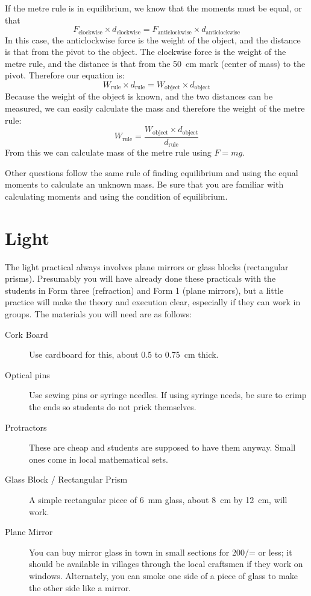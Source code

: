 If the metre rule is in equilibrium, we know that the moments must be equal, or
that $$F_{\mathrm{clockwise}} \times d_{\mathrm{clockwise}} = F_{\mathrm{anticlockwise}} \times d_{\mathrm{anticlockwise}}$$
In this case, the anticlockwise force is the weight of the object, and the distance is that
from the pivot to the object. The clockwise force is the weight of the metre rule, and the
distance is that from the 50~cm mark (center of mass) to the pivot. Therefore our
equation is: $$ W_{\mathrm{rule}} \times d_{\mathrm{rule}} = W_{\mathrm{object}} \times d_{\mathrm{object}} $$
Because the weight of the object is known, and the two distances can be measured, we
can easily calculate the mass and therefore the weight of the metre rule:
$$W_{\mathrm{rule}} = \frac{W_{\mathrm{object}} \times d_{\mathrm{object}}}{d_{\mathrm{rule}}}$$
From this we can calculate mass of the metre rule using $F = mg$.

Other questions follow the same rule of finding equilibrium and using the equal
moments to calculate an unknown mass. Be sure that you are familiar with calculating
moments and using the condition of equilibrium.

\section{Light}
The light practical always involves plane mirrors or glass blocks (rectangular
prisms). Presumably you will have already done these practicals with the students in Form
three (refraction) and Form 1 (plane mirrors), but a little practice will make the theory and
execution clear, especially if they can work in groups. The materials you will need are as
follows:
\begin{description}
\item[Cork Board]{Use cardboard for this, about 0.5 to 0.75~cm thick.}
\item[Optical pins]{Use sewing pins or syringe needles. If using syringe needs, be
sure to crimp the ends so students do not prick themselves.}
\item[Protractors]{These are cheap and students are supposed to have them anyway.
Small ones come in local mathematical sets.}
\item[Glass Block / Rectangular Prism]{A simple rectangular piece of 6~mm glass,
about 8~cm by 12~cm, will work.}
\item[Plane Mirror]{You can buy mirror glass in town in small sections for 200/= or
less; it should be available in villages through the local craftsmen if they work on
windows. Alternately, you can smoke one side of a piece of glass to make the
other side like a mirror.}
\end{description}

